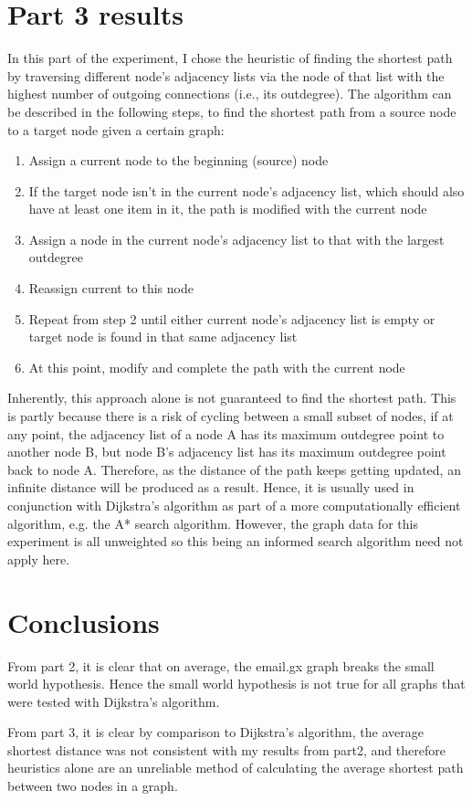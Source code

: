 \documentclass{article}
\begin{document}

\section{Part 3 results}
\label{sec:part3}
In this part of the experiment, I chose the heuristic of finding the shortest
path by traversing different node's adjacency lists via the node of that list
with the highest number of outgoing connections (i.e., its outdegree). The
algorithm can be described in the following steps, to find the shortest path
from a source node to a target node given a certain graph:
\begin{enumerate}
\item Assign a current node to the beginning (source) node
\item If the target node isn't in the current node's adjacency list, which
should also have at least one item in it, the path is modified with the current
node
\item Assign a node in the current node's adjacency list to that with the
largest outdegree
\item Reassign current to this node
\item Repeat from step 2 until either current node's adjacency list is empty or
target node is found in that same adjacency list
\item At this point, modify and complete the path with the current node
\end{enumerate}

\noindent Inherently, this approach alone is not guaranteed to find the
shortest path. This is partly because there is a risk of cycling between a
small subset of nodes, if at any point, the adjacency list of a node A has its
maximum outdegree point to another node B, but node B's adjacency list has its
maximum outdegree point back to node A. Therefore, as the distance of the path
keeps getting updated, an infinite distance will be produced as a result. Hence,
it is usually used in conjunction with Dijkstra's algorithm as part of a more
computationally efficient algorithm, e.g. the A* search algorithm. However,
the graph data for this experiment is all unweighted so this being an informed
search algorithm need not apply here. \par


\section{Conclusions}
\label{sec:conclusions}
From part 2, it is clear that on average, the email.gx graph breaks the small
world hypothesis. Hence the small world hypothesis is not true for all graphs
that were tested with Dijkstra's algorithm.\par

\noindent From part 3, it is clear by comparison to Dijkstra's algorithm, the
average shortest distance was not consistent with my results from part2, and
therefore heuristics alone are an unreliable method of calculating the average
shortest path between two nodes in a graph.
\end{document}
